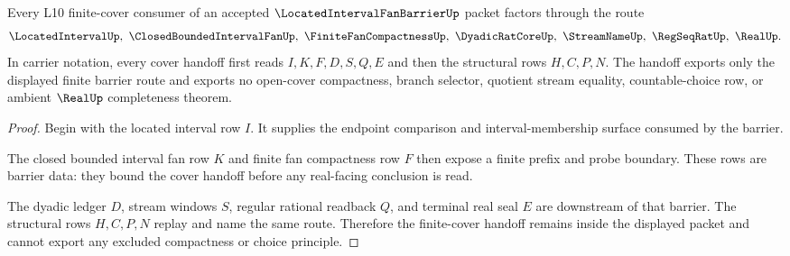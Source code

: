 \begin{theorem}
\label{thm:located-interval-fan-barrier-finite-cover-handoff}
Every L10 finite-cover consumer of an accepted $\LocatedIntervalFanBarrierUp$ packet factors through the route
$$
\LocatedIntervalUp,\ \ClosedBoundedIntervalFanUp,\ \FiniteFanCompactnessUp,\ \DyadicRatCoreUp,\ \StreamNameUp,\ \RegSeqRatUp,\ \RealUp .
$$
In carrier notation, every cover handoff first reads $I,K,F,D,S,Q,E$ and then the structural rows $H,C,P,N$. The handoff exports only the displayed finite barrier route and exports no open-cover compactness, branch selector, quotient stream equality, countable-choice row, or ambient $\RealUp$ completeness theorem.
\end{theorem}
\begin{proof}
Begin with the located interval row $I$. It supplies the endpoint comparison and interval-membership surface consumed by the barrier.

The closed bounded interval fan row $K$ and finite fan compactness row $F$ then expose a finite prefix and probe boundary. These rows are barrier data: they bound the cover handoff before any real-facing conclusion is read.

The dyadic ledger $D$, stream windows $S$, regular rational readback $Q$, and terminal real seal $E$ are downstream of that barrier. The structural rows $H,C,P,N$ replay and name the same route. Therefore the finite-cover handoff remains inside the displayed packet and cannot export any excluded compactness or choice principle.
\end{proof}

